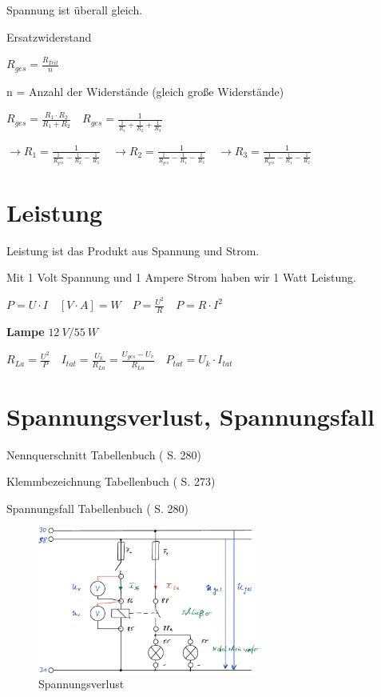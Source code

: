Spannung ist überall gleich.

Ersatzwiderstand

$\boxed{R_{ges} = \frac{R_{Teil}}{n}}$

n = Anzahl der Widerstände (gleich große Widerstände)

$\boxed{R_{ges} = \frac{R_1 \cdot R_2}{R_1 + R_2}} \quad R_{ges} = \frac{1}{\frac{1}{R_1} + \frac{1}{R_2} + \frac{1}{R_3}}$

$\to R_{1} = \frac{1}{\frac{1}{R_{ges}} - \frac{1}{R_2} - \frac{1}{R_3}} \quad \to R_{2} = \frac{1}{\frac{1}{R_{ges}} - \frac{1}{R_1} - \frac{1}{R_3}} \quad \to R_{3} = \frac{1}{\frac{1}{R_{ges}} - \frac{1}{R_1} - \frac{1}{R_2}}$

\section{Leistung}\label{leistung}

Leistung ist das Produkt aus Spannung und Strom.

Mit 1 Volt Spannung und 1 Ampere Strom haben wir 1 Watt Leistung.

$\boxed{P = U \cdot I} \quad [V \cdot A] = W \quad \boxed{P = \frac{U^2}{R}} \quad \boxed{P = R \cdot I^2}$

\textbf{Lampe} $12~V/55~W$

$R_{La} = \frac{U^2}{P} \quad I_{tat} = \frac{U_k}{R_{La}} = \frac{U_{ges} - U_v}{R_{La}} \quad P_{tat} = U_k \cdot I_{tat}$

\newpage

\section{Spannungsverlust,
Spannungsfall}\label{spannungsverlust-spannungsfall}

Nennquerschnitt Tabellenbuch (\textcite{bell:2021:tabellenbuchKfz} S. 280)

Klemmbezeichnung Tabellenbuch (\textcite{bell:2021:tabellenbuchKfz} S. 273)

Spannungsfall Tabellenbuch (\textcite{bell:2021:tabellenbuchKfz} S. 280)

\begin{figure}[!ht]%
\centering
\includegraphics[width=0.65\textwidth]{images/Skizze/13_Spannungsverlust_Skizze.pdf}
\caption{Spannungsverlust}
\end{figure}

